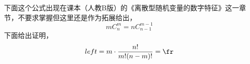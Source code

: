 下面这个公式出现在课本（人教B版）的《离散型随机变量的数字特征》这一章节，不要求掌握但这里还是作为拓展给出，
\begin{equation}
mC_n^m = nC_{n-1}^{m-1}
\end{equation}
下面给出证明，
\begin{equation}
left = m\cdot \frac{n!}{m!(n-m)!} = \fr
\end{equation}
